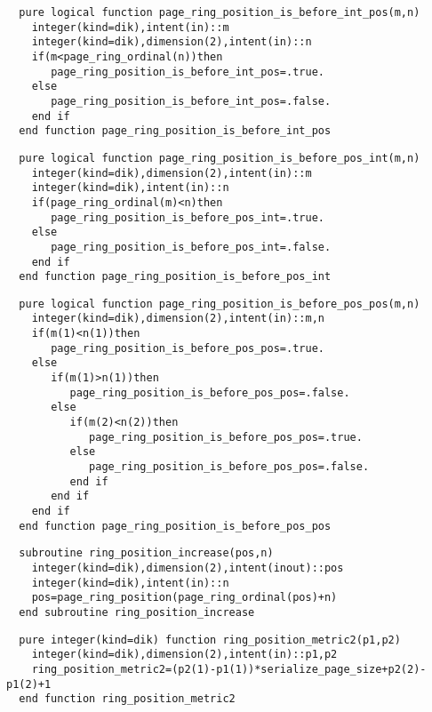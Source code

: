 \begin{Verbatim}
  pure logical function page_ring_position_is_before_int_pos(m,n)
    integer(kind=dik),intent(in)::m
    integer(kind=dik),dimension(2),intent(in)::n
    if(m<page_ring_ordinal(n))then
       page_ring_position_is_before_int_pos=.true.
    else
       page_ring_position_is_before_int_pos=.false.
    end if
  end function page_ring_position_is_before_int_pos
\end{Verbatim}

\begin{Verbatim}
  pure logical function page_ring_position_is_before_pos_int(m,n)
    integer(kind=dik),dimension(2),intent(in)::m
    integer(kind=dik),intent(in)::n
    if(page_ring_ordinal(m)<n)then
       page_ring_position_is_before_pos_int=.true.
    else
       page_ring_position_is_before_pos_int=.false.
    end if
  end function page_ring_position_is_before_pos_int
\end{Verbatim}

\begin{Verbatim}
  pure logical function page_ring_position_is_before_pos_pos(m,n)
    integer(kind=dik),dimension(2),intent(in)::m,n
    if(m(1)<n(1))then
       page_ring_position_is_before_pos_pos=.true.
    else
       if(m(1)>n(1))then
          page_ring_position_is_before_pos_pos=.false.
       else
          if(m(2)<n(2))then
             page_ring_position_is_before_pos_pos=.true.
          else
             page_ring_position_is_before_pos_pos=.false.
          end if
       end if
    end if
  end function page_ring_position_is_before_pos_pos
\end{Verbatim}

\begin{Verbatim}
  subroutine ring_position_increase(pos,n)
    integer(kind=dik),dimension(2),intent(inout)::pos
    integer(kind=dik),intent(in)::n
    pos=page_ring_position(page_ring_ordinal(pos)+n)
  end subroutine ring_position_increase
\end{Verbatim}

\begin{Verbatim}
  pure integer(kind=dik) function ring_position_metric2(p1,p2)
    integer(kind=dik),dimension(2),intent(in)::p1,p2
    ring_position_metric2=(p2(1)-p1(1))*serialize_page_size+p2(2)-p1(2)+1
  end function ring_position_metric2
\end{Verbatim}

